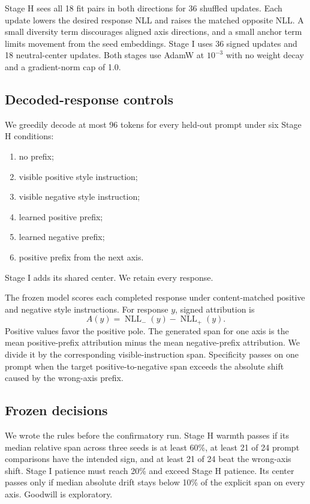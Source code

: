 \documentclass[10pt]{article}
\begin{document}
Stage H sees all 18 fit pairs in both directions for 36 shuffled updates. Each
update lowers the desired response NLL and raises the matched opposite NLL. A
small diversity term discourages aligned axis directions, and a small anchor
term limits movement from the seed embeddings. Stage I uses 36 signed updates
and 18 neutral-center updates. Both stages use AdamW at $10^{-3}$ with no
weight decay and a gradient-norm cap of 1.0.

\subsection{Decoded-response controls}

We greedily decode at most 96 tokens for every held-out prompt under six Stage
H conditions:
\begin{enumerate}
  \item no prefix;
  \item visible positive style instruction;
  \item visible negative style instruction;
  \item learned positive prefix;
  \item learned negative prefix;
  \item positive prefix from the next axis.
\end{enumerate}
Stage I adds its shared center. We retain every response.

The frozen model scores each completed response under content-matched positive
and negative style instructions. For response $y$, signed attribution is
\begin{equation}
  A(y) = \operatorname{NLL}_{-}(y) - \operatorname{NLL}_{+}(y).
\end{equation}
Positive values favor the positive pole. The generated span for one axis is
the mean positive-prefix attribution minus the mean negative-prefix
attribution. We divide it by the corresponding visible-instruction span.
Specificity passes on one prompt when the target positive-to-negative span
exceeds the absolute shift caused by the wrong-axis prefix.

\subsection{Frozen decisions}

We wrote the rules before the confirmatory run. Stage H warmth passes if its
median relative span across three seeds is at least 60\%, at least 21 of 24
prompt comparisons have the intended sign, and at least 21 of 24 beat the
wrong-axis shift. Stage I patience must reach 20\% and exceed Stage H patience.
Its center passes only if median absolute drift stays below 10\% of the
explicit span on every axis. Goodwill is exploratory.
\end{document}
